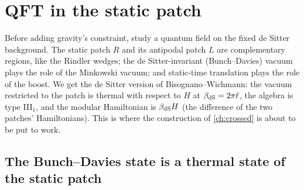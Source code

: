 \section{QFT in the static patch}\label{ch:static_patch}

\begin{physmotiv}
Before adding gravity's constraint, study a quantum field on the fixed de Sitter background. The static patch $R$ and its antipodal patch $L$ are complementary regions, like the Rindler wedges; the de Sitter-invariant (Bunch--Davies) vacuum plays the role of the Minkowski vacuum; and static-time translation plays the role of the boost. We get the de Sitter version of Bisognano--Wichmann: the vacuum restricted to the patch is thermal with respect to $H$ at $\beta_{\rm dS}=2\pi\ell$, the algebra is type III$_1$, and the modular Hamiltonian is $\beta_{\rm dS}H$ (the difference of the two patches' Hamiltonians). This is where the construction of \cref{ch:crossed} is about to be put to work.
\end{physmotiv}

\subsection{The Bunch--Davies state is a thermal state of the static patch}

